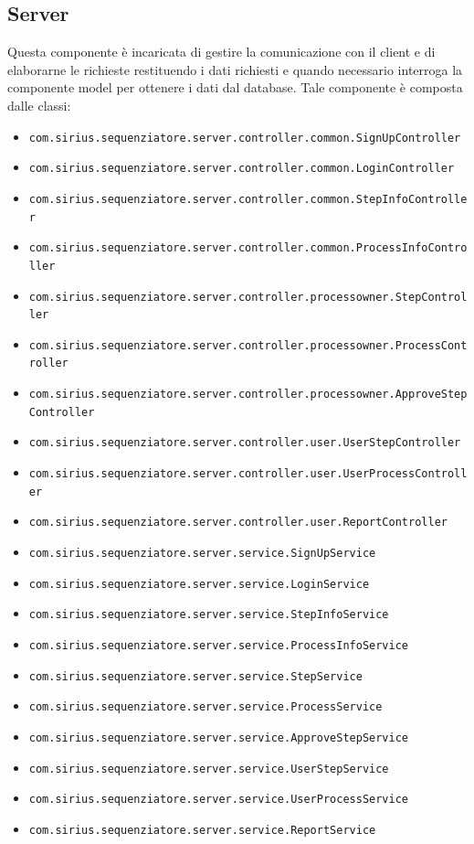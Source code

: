 \subsection{Server}
Questa componente è incaricata di gestire la comunicazione con il client e di elaborarne le richieste restituendo i dati richiesti e quando necessario interroga la componente model per ottenere i dati dal database.
Tale componente è composta dalle classi:
\begin{itemize}
	\item \texttt{com.sirius.sequenziatore.server.controller.common.SignUpController}
	\item \texttt{com.sirius.sequenziatore.server.controller.common.LoginController}
	\item \texttt{com.sirius.sequenziatore.server.controller.common.StepInfoController}
	\item \texttt{com.sirius.sequenziatore.server.controller.common.ProcessInfoController}
	\item \texttt{com.sirius.sequenziatore.server.controller.processowner.StepController}
	\item \texttt{com.sirius.sequenziatore.server.controller.processowner.ProcessController}
	\item \texttt{com.sirius.sequenziatore.server.controller.processowner.ApproveStepController}
	\item \texttt{com.sirius.sequenziatore.server.controller.user.UserStepController}
	\item \texttt{com.sirius.sequenziatore.server.controller.user.UserProcessController}
	\item \texttt{com.sirius.sequenziatore.server.controller.user.ReportController}
	\item \texttt{com.sirius.sequenziatore.server.service.SignUpService}
	\item \texttt{com.sirius.sequenziatore.server.service.LoginService}
	\item \texttt{com.sirius.sequenziatore.server.service.StepInfoService}
	\item \texttt{com.sirius.sequenziatore.server.service.ProcessInfoService}
	\item \texttt{com.sirius.sequenziatore.server.service.StepService}
	\item \texttt{com.sirius.sequenziatore.server.service.ProcessService}
	\item \texttt{com.sirius.sequenziatore.server.service.ApproveStepService}
	\item \texttt{com.sirius.sequenziatore.server.service.UserStepService}
	\item \texttt{com.sirius.sequenziatore.server.service.UserProcessService}
	\item \texttt{com.sirius.sequenziatore.server.service.ReportService}
\end{itemize}
